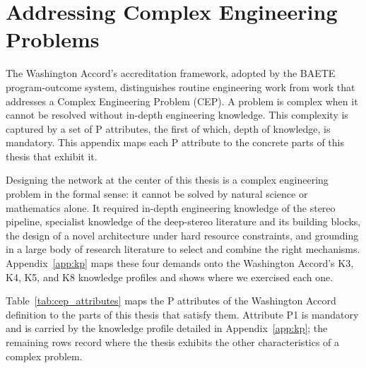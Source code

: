\chapter{Addressing Complex Engineering Problems}
\label{app:cep}

The Washington Accord's accreditation framework, adopted by the BAETE
program-outcome system, distinguishes routine engineering work from
work that addresses a Complex Engineering Problem (CEP). A problem is
complex when it cannot be resolved without in-depth engineering
knowledge. This complexity is captured by a set of P attributes, the
first of which, depth of knowledge, is mandatory. This appendix maps
each P attribute to the concrete parts of this thesis that exhibit it.

Designing the network at the center of this thesis is a complex
engineering problem in the formal sense: it cannot be solved by
natural science or mathematics alone. It required in-depth engineering
knowledge of the stereo pipeline, specialist knowledge of the
deep-stereo literature and its building blocks, the design of a novel
architecture under hard resource constraints, and grounding in a large
body of research literature to select and combine the right
mechanisms. Appendix~\ref{app:kp} maps these four demands onto the
Washington Accord's K3, K4, K5, and K8 knowledge profiles and shows
where we exercised each one.

Table~\ref{tab:cep_attributes} maps the P attributes of the Washington
Accord definition to the parts of this thesis that satisfy them.
Attribute P1 is mandatory and is carried by the knowledge profile
detailed in Appendix~\ref{app:kp}; the remaining rows record where the
thesis exhibits the other characteristics of a complex problem.

